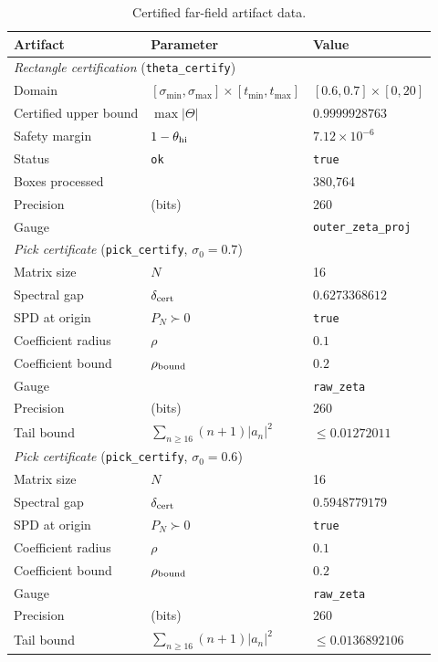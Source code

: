 \documentclass[11pt]{article}
\begin{document}
\begin{table}[H]
\centering
\caption{Certified far-field artifact data.}\label{tab:artifact-data}
\small
\begin{tabular}{l l l}
\toprule
\textbf{Artifact} & \textbf{Parameter} & \textbf{Value} \\
\midrule
\multicolumn{3}{l}{\textit{Rectangle certification} (\texttt{theta\_certify})} \\
\quad Domain & $[\sigma_{\min}, \sigma_{\max}] \times [t_{\min}, t_{\max}]$ & $[0.6, 0.7] \times [0, 20]$ \\
\quad Certified upper bound & $\max |\Theta|$ & $0.9999928763$ \\
\quad Safety margin & $1 - \theta_{\rm hi}$ & $7.12 \times 10^{-6}$ \\
\quad Status & \texttt{ok} & \texttt{true} \\
\quad Boxes processed & & 380{,}764 \\
\quad Precision & (bits) & 260 \\
\quad Gauge & & \texttt{outer\_zeta\_proj} \\
\midrule
\multicolumn{3}{l}{\textit{Pick certificate} (\texttt{pick\_certify}, $\sigma_0 = 0.7$)} \\
\quad Matrix size & $N$ & 16 \\
\quad Spectral gap & $\delta_{\rm cert}$ & $0.6273368612$ \\
\quad SPD at origin & $P_N \succ 0$ & \texttt{true} \\
\quad Coefficient radius & $\rho$ & $0.1$ \\
\quad Coefficient bound & $\rho_{\rm bound}$ & $0.2$ \\
\quad Gauge & & \texttt{raw\_zeta} \\
\quad Precision & (bits) & 260 \\
\quad Tail bound & $\sum_{n\ge 16}(n+1)|a_n|^2$ & $\le 0.01272011$ \\
\midrule
\multicolumn{3}{l}{\textit{Pick certificate} (\texttt{pick\_certify}, $\sigma_0 = 0.6$)} \\
\quad Matrix size & $N$ & 16 \\
\quad Spectral gap & $\delta_{\rm cert}$ & $0.5948779179$ \\
\quad SPD at origin & $P_N \succ 0$ & \texttt{true} \\
\quad Coefficient radius & $\rho$ & $0.1$ \\
\quad Coefficient bound & $\rho_{\rm bound}$ & $0.2$ \\
\quad Gauge & & \texttt{raw\_zeta} \\
\quad Precision & (bits) & 260 \\
\quad Tail bound & $\sum_{n\ge 16}(n+1)|a_n|^2$ & $\le 0.0136892106$ \\
\bottomrule
\end{tabular}
\end{table}
\end{document}
